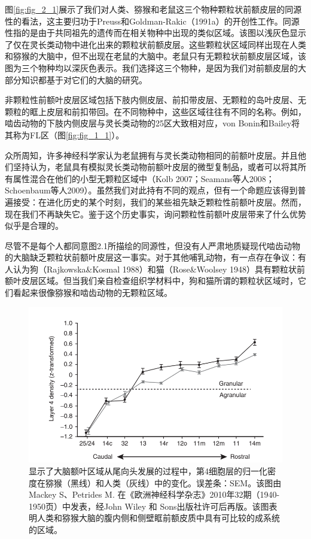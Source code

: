 图\ref{fig:fig_2_1}展示了我们对人类、猕猴和老鼠这三个物种颗粒状前额皮层的同源性的看法，这主要归功于Preuss和Goldman-Rakic（1991a）的开创性工作。同源性指的是由于共同祖先的遗传而在相关物种中出现的类似区域。该图以浅灰色显示了仅在灵长类动物中进化出来的颗粒状前额皮层。这些颗粒状区域同样出现在人类和猕猴的大脑中，但不出现在老鼠的大脑中。老鼠只有无颗粒状前额皮层区域，该图为三个物种均以深灰色表示。我们选择这三个物种，是因为我们对前额皮层的大部分知识都基于对它们的大脑的研究。

非颗粒性前额叶皮层区域包括下肢内侧皮层、前扣带皮层、无颗粒的岛叶皮层、无颗粒的眶上皮层和前扣带回。在不同物种中，这些区域往往有不同的名称。例如，啮齿动物的下肢内侧皮层与灵长类动物的25区大致相对应，von Bonin和Bailey将其称为FL区（图\ref{fig:fig_1_1}）。

众所周知，许多神经科学家认为老鼠拥有与灵长类动物相同的前额叶皮层。并且他们坚持认为，老鼠具有模拟灵长类动物前额叶皮层的微型复制品，或者可以将其所有属性混合在他们的小型无颗粒区域中（Kolb 2007；Seamans等人2008；Schoenbaum等人2009）。虽然我们对此持有不同的观点，但有一个命题应该得到普遍接受：在进化历史的某个时刻，我们的某些祖先缺乏颗粒性前额叶皮层。然而，现在我们不再缺失它。鉴于这个历史事实，询问颗粒性前额叶皮层带来了什么优势似乎是合理的。

尽管不是每个人都同意图2.1所描绘的同源性，但没有人严肃地质疑现代啮齿动物的大脑缺乏颗粒状前额叶皮层这一事实。对于其他哺乳动物，有一点存在争议：有人认为狗（Rajkowska\&Kosmal 1988）和猫（Rose\&Woolsey 1948）具有颗粒状前额叶皮层区域。但当我们亲自检查组织学材料中，狗和猫所谓的颗粒状区域时，它们看起来很像猕猴和啮齿动物的无颗粒区域。

\begin{figure}[!htb]
	\centering
	\includegraphics[width=0.8\linewidth]{image_pfc/Fig_2_2}
	\caption{显示了大脑额叶区域从尾向头发展的过程中，第4细胞层的归一化密度在猕猴（黑线）和人类（灰线）中的变化。误差条：SEM。该图由 Mackey S、Petrides M. 在《欧洲神经科学杂志》2010年32期（1940-1950页）中发表，经John Wiley 和 Sons出版社许可后再版。该图表明人类和猕猴大脑的腹内侧和侧壁眶前额皮质中具有可比较的成系统的区域。\label{fig:fig_2_2}}
\end{figure}

